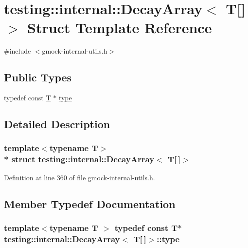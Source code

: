 \hypertarget{structtesting_1_1internal_1_1_decay_array_3_01_t[]_4}{}\section{testing\+:\+:internal\+:\+:Decay\+Array$<$ T\mbox{[}\mbox{]}$>$ Struct Template Reference}
\label{structtesting_1_1internal_1_1_decay_array_3_01_t[]_4}


{\ttfamily \#include $<$gmock-\/internal-\/utils.\+h$>$}

\subsection*{Public Types}
\begin{DoxyCompactItemize}
\item 
typedef const \hyperlink{functions__7_8js_adf1f3edb9115acb0a1e04209b7a9937b}{T} $\ast$ \hyperlink{structtesting_1_1internal_1_1_decay_array_3_01_t[]_4_a1820b673d104b3a985faaef8db5d77d2}{type}
\end{DoxyCompactItemize}


\subsection{Detailed Description}
\subsubsection*{template$<$typename T$>$\\*
struct testing\+::internal\+::\+Decay\+Array$<$ T\mbox{[}$\,$\mbox{]}$>$}



Definition at line 360 of file gmock-\/internal-\/utils.\+h.



\subsection{Member Typedef Documentation}
\subsubsection[{\texorpdfstring{type}{type}}]{\setlength{\rightskip}{0pt plus 5cm}template$<$typename T $>$ typedef const {\bf T}$\ast$ {\bf testing\+::internal\+::\+Decay\+Array}$<$ {\bf T}\mbox{[}$\,$\mbox{]}$>$\+::{\bf type}}\hypertarget{structtesting_1_1internal_1_1_decay_array_3_01_t[]_4_a1820b673d104b3a985faaef8db5d77d2}{}\label{structtesting_1_1internal_1_1_decay_array_3_01_t[]_4_a1820b673d104b3a985faaef8db5d77d2}


